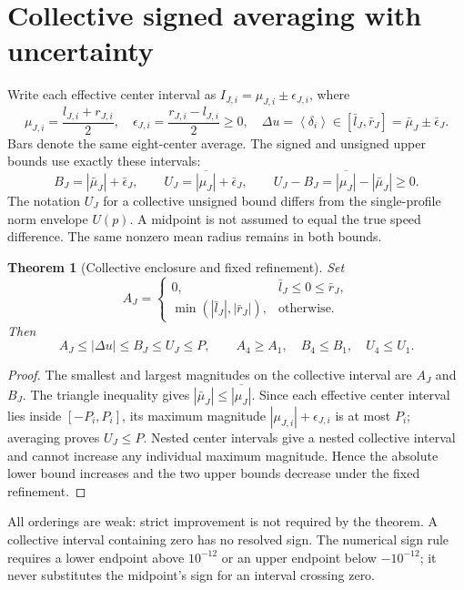 \documentclass[11pt,a4paper]{article}
\newtheorem{theorem}{Theorem}\newtheorem{proposition}[theorem]{Proposition}
\newcommand{\avg}[1]{\left\langle #1\right\rangle}
\begin{document}
\clearpage
\section{Collective signed averaging with uncertainty}\label{sec:averaging}
Write each effective center interval as $I_{J,i}=\mu_{J,i}\pm\epsilon_{J,i}$, where
\begin{equation}\label{eq:midradius}
\mu_{J,i}=\frac{l_{J,i}+r_{J,i}}2,\quad
\epsilon_{J,i}=\frac{r_{J,i}-l_{J,i}}2\ge0,\quad
\Delta u=\avg{\delta_i}\in[\bar l_J,\bar r_J]=\bar\mu_J\pm\bar\epsilon_J.
\end{equation}
Bars denote the same eight-center average. The signed and unsigned upper bounds use exactly these intervals:
\begin{equation}\label{eq:signedunsigned}
B_J=|\bar\mu_J|+\bar\epsilon_J,\qquad
U_J=\overline{|\mu_J|}+\bar\epsilon_J,\qquad
U_J-B_J=\overline{|\mu_J|}-|\bar\mu_J|\ge0.
\end{equation}
The notation $U_J$ for a collective unsigned bound differs from the single-profile norm envelope $U(p)$. A midpoint is not assumed to equal the true speed difference. The same nonzero mean radius remains in both bounds.

\begin{theorem}[Collective enclosure and fixed refinement]\label{thm:collective}
Set
\begin{equation}\label{eq:lower}
A_J=\begin{cases}0,&\bar l_J\le0\le\bar r_J,\\
\min(|\bar l_J|,|\bar r_J|),&\mathrm{otherwise}.
\end{cases}
\end{equation}
Then
\begin{equation}\label{eq:ordering}
A_J\le|\Delta u|\le B_J\le U_J\le P,\qquad
A_4\ge A_1,\quad B_4\le B_1,\quad U_4\le U_1.
\end{equation}
\end{theorem}
\begin{proof}
The smallest and largest magnitudes on the collective interval are $A_J$ and $B_J$. The triangle inequality gives $|\bar\mu_J|\le\overline{|\mu_J|}$. Since each effective center interval lies inside $[-P_i,P_i]$, its maximum magnitude $|\mu_{J,i}|+\epsilon_{J,i}$ is at most $P_i$; averaging proves $U_J\le P$. Nested center intervals give a nested collective interval and cannot increase any individual maximum magnitude. Hence the absolute lower bound increases and the two upper bounds decrease under the fixed refinement.
\end{proof}
All orderings are weak: strict improvement is not required by the theorem. A collective interval containing zero has no resolved sign. The numerical sign rule requires a lower endpoint above $10^{-12}$ or an upper endpoint below $-10^{-12}$; it never substitutes the midpoint's sign for an interval crossing zero.
\end{document}

